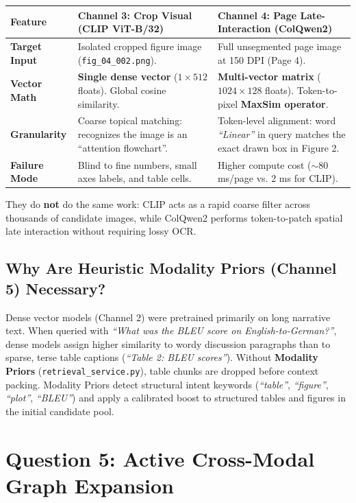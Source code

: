 \documentclass[11pt,a4paper]{article}
\begin{document}
\begin{center}
\small
\begin{tabular}{@{}lp{6cm}p{6cm}@{}}
\toprule
\textbf{Feature} & \textbf{Channel 3: Crop Visual (CLIP ViT-B/32)} & \textbf{Channel 4: Page Late-Interaction (ColQwen2)} \\
\midrule
\textbf{Target Input} & Isolated cropped figure image (\texttt{fig\_04\_002.png}). & Full unsegmented page image at 150 DPI (Page 4). \\
\textbf{Vector Math} & \textbf{Single dense vector} ($1 \times 512$ floats). Global cosine similarity. & \textbf{Multi-vector matrix} ($1024 \times 128$ floats). Token-to-pixel \textbf{MaxSim operator}. \\
\textbf{Granularity} & Coarse topical matching: recognizes the image is an ``attention flowchart''. & Token-level alignment: word \textit{``Linear''} in query matches the exact drawn box in Figure 2. \\
\textbf{Failure Mode} & Blind to fine numbers, small axes labels, and table cells. & Higher compute cost ($\sim 80$ ms/page vs. 2 ms for CLIP). \\
\bottomrule
\end{tabular}
\end{center}

They do \textbf{not} do the same work: CLIP acts as a rapid coarse filter across thousands of candidate images, while ColQwen2 performs token-to-patch spatial late interaction without requiring lossy OCR.

\subsection{Why Are Heuristic Modality Priors (Channel 5) Necessary?}
Dense vector models (Channel 2) were pretrained primarily on long narrative text. When queried with \textit{``What was the BLEU score on English-to-German?''}, dense models assign higher similarity to wordy discussion paragraphs than to sparse, terse table captions (\textit{``Table 2: BLEU scores''}). Without \textbf{Modality Priors} (\texttt{retrieval\_service.py}), table chunks are dropped before context packing. Modality Priors detect structural intent keywords (\textit{``table''}, \textit{``figure''}, \textit{``plot''}, \textit{``BLEU''}) and apply a calibrated boost to structured tables and figures in the initial candidate pool.

\newpage

\section{Question 5: Active Cross-Modal Graph Expansion}
\end{document}

